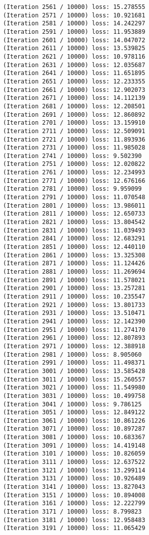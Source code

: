 \documentclass[11pt]{article}
\begin{document}
\begin{Verbatim}[commandchars=\\\{\}]
(Iteration 2561 / 10000) loss: 15.278555
(Iteration 2571 / 10000) loss: 10.921681
(Iteration 2581 / 10000) loss: 14.242297
(Iteration 2591 / 10000) loss: 11.953889
(Iteration 2601 / 10000) loss: 14.047072
(Iteration 2611 / 10000) loss: 13.539825
(Iteration 2621 / 10000) loss: 10.978116
(Iteration 2631 / 10000) loss: 12.035687
(Iteration 2641 / 10000) loss: 11.651895
(Iteration 2651 / 10000) loss: 12.233355
(Iteration 2661 / 10000) loss: 12.902073
(Iteration 2671 / 10000) loss: 14.112139
(Iteration 2681 / 10000) loss: 12.208501
(Iteration 2691 / 10000) loss: 12.860892
(Iteration 2701 / 10000) loss: 13.159910
(Iteration 2711 / 10000) loss: 12.509091
(Iteration 2721 / 10000) loss: 11.893936
(Iteration 2731 / 10000) loss: 11.985028
(Iteration 2741 / 10000) loss: 9.502390
(Iteration 2751 / 10000) loss: 12.020822
(Iteration 2761 / 10000) loss: 12.234993
(Iteration 2771 / 10000) loss: 12.676166
(Iteration 2781 / 10000) loss: 9.959099
(Iteration 2791 / 10000) loss: 11.070548
(Iteration 2801 / 10000) loss: 13.986011
(Iteration 2811 / 10000) loss: 12.650733
(Iteration 2821 / 10000) loss: 13.804542
(Iteration 2831 / 10000) loss: 11.039493
(Iteration 2841 / 10000) loss: 12.683291
(Iteration 2851 / 10000) loss: 12.440110
(Iteration 2861 / 10000) loss: 13.325308
(Iteration 2871 / 10000) loss: 11.124426
(Iteration 2881 / 10000) loss: 11.269694
(Iteration 2891 / 10000) loss: 11.578021
(Iteration 2901 / 10000) loss: 13.257281
(Iteration 2911 / 10000) loss: 10.235547
(Iteration 2921 / 10000) loss: 13.801733
(Iteration 2931 / 10000) loss: 13.510471
(Iteration 2941 / 10000) loss: 12.142390
(Iteration 2951 / 10000) loss: 11.274170
(Iteration 2961 / 10000) loss: 12.807893
(Iteration 2971 / 10000) loss: 12.388918
(Iteration 2981 / 10000) loss: 8.905060
(Iteration 2991 / 10000) loss: 11.498371
(Iteration 3001 / 10000) loss: 13.585428
(Iteration 3011 / 10000) loss: 15.260557
(Iteration 3021 / 10000) loss: 11.549980
(Iteration 3031 / 10000) loss: 10.499758
(Iteration 3041 / 10000) loss: 9.786125
(Iteration 3051 / 10000) loss: 12.849122
(Iteration 3061 / 10000) loss: 10.861226
(Iteration 3071 / 10000) loss: 10.897287
(Iteration 3081 / 10000) loss: 10.683367
(Iteration 3091 / 10000) loss: 14.419148
(Iteration 3101 / 10000) loss: 10.826059
(Iteration 3111 / 10000) loss: 12.637522
(Iteration 3121 / 10000) loss: 13.299114
(Iteration 3131 / 10000) loss: 10.926489
(Iteration 3141 / 10000) loss: 13.827043
(Iteration 3151 / 10000) loss: 10.894008
(Iteration 3161 / 10000) loss: 12.222799
(Iteration 3171 / 10000) loss: 8.799823
(Iteration 3181 / 10000) loss: 12.958483
(Iteration 3191 / 10000) loss: 11.065429

\end{Verbatim}
\end{document}
